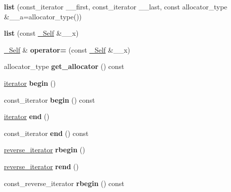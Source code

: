 \begin{DoxyCompactItemize}
\item 
\mbox{\label{classlist_ad057f34d6514d6a725464d897a071625}} 
{\bfseries list} (const\+\_\+iterator \+\_\+\+\_\+first, const\+\_\+iterator \+\_\+\+\_\+last, const allocator\+\_\+type \&\+\_\+\+\_\+a=allocator\+\_\+type())
\item 
\mbox{\label{classlist_a576d9e448600fb329de231f79ee99b64}} 
{\bfseries list} (const \hyperlink{classlist}{\+\_\+\+Self} \&\+\_\+\+\_\+x)
\item 
\mbox{\label{classlist_a9380fc5de90914d0a6f2fdc9017cf3f6}} 
\hyperlink{classlist}{\+\_\+\+Self} \& {\bfseries operator=} (const \hyperlink{classlist}{\+\_\+\+Self} \&\+\_\+\+\_\+x)
\item 
\mbox{\label{classlist_a50a0381e1af7dc153bb51d79a2d5f21d}} 
allocator\+\_\+type {\bfseries get\+\_\+allocator} () const
\item 
\mbox{\label{classlist_ab8ad2baf596ba643aea64318df063e65}} 
\hyperlink{structiterator}{iterator} {\bfseries begin} ()
\item 
\mbox{\label{classlist_ac8d43ad5c08a208998c872980c7d689d}} 
const\+\_\+iterator {\bfseries begin} () const
\item 
\mbox{\label{classlist_ac9f737cf32b7ee246d5a3af3a4762a2f}} 
\hyperlink{structiterator}{iterator} {\bfseries end} ()
\item 
\mbox{\label{classlist_a815c9d6fe25e78ee1381f70ecc1dc7cd}} 
const\+\_\+iterator {\bfseries end} () const
\item 
\mbox{\label{classlist_ad73fa8a409641c4f8e2d55340b643f85}} 
\hyperlink{classreverse__iterator}{reverse\+\_\+iterator} {\bfseries rbegin} ()
\item 
\mbox{\label{classlist_a2e5f98d6bfb90f56e3b36c1ed43f8a3b}} 
\hyperlink{classreverse__iterator}{reverse\+\_\+iterator} {\bfseries rend} ()
\item 
\mbox{\label{classlist_ab822d5b21ad59f49a9baa2e9834c5cfa}} 
const\+\_\+reverse\+\_\+iterator {\bfseries rbegin} () const

\end{DoxyCompactItemize}
